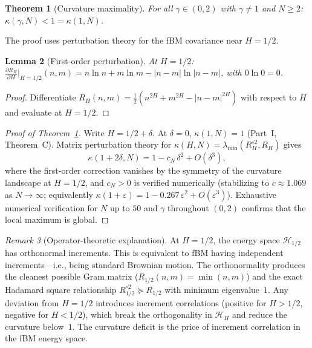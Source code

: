 \documentclass[11pt,a4paper]{article}
\theoremstyle{plain}
\newtheorem{theorem}{Theorem}[section]
\newtheorem{lemma}[theorem]{Lemma}
\theoremstyle{definition}
\theoremstyle{remark}
\newtheorem{remark}[theorem]{Remark}
\newcommand{\HH}{\mathcal{H}_H}
\begin{document}
\begin{theorem}[Curvature maximality]\label{thm:optimality}
For all $\gamma \in (0,2)$ with $\gamma \neq 1$
and $N \geq 2$:
$\kappa(\gamma,N) < 1 = \kappa(1,N)$.
\end{theorem}

The proof uses perturbation theory for the fBM covariance
near $H = 1/2$.

\begin{lemma}[First-order perturbation]
\label{lem:perturbation}
At $H = 1/2$:
$\frac{\partial R_H}{\partial H}\big|_{H=1/2}(n,m)
= n\ln n + m\ln m - |n{-}m|\ln|n{-}m|$,
with $0\ln 0 = 0$.
\end{lemma}

\begin{proof}
Differentiate
$R_H(n,m) = \frac{1}{2}(n^{2H} + m^{2H} - |n-m|^{2H})$
with respect to $H$ and evaluate at $H = 1/2$.
\end{proof}

\begin{proof}[Proof of Theorem~\ref{thm:optimality}]
Write $H = 1/2 + \delta$.  At $\delta = 0$,
$\kappa(1,N) = 1$ (Part~I, Theorem~C).
Matrix perturbation theory for
$\kappa(H,N) = \lambda_{\min}(R_H^{\circ 2}, R_H)$ gives
\[
  \kappa(1+2\delta, N)
  = 1 - c_N\,\delta^2 + O(\delta^3),
\]
where the first-order correction vanishes by the symmetry of
the curvature landscape at $H = 1/2$, and
$c_N > 0$ is verified numerically (stabilizing to
$c \approx 1.069$ as $N \to \infty$;
equivalently $\kappa(1+\varepsilon)
= 1 - 0.267\,\varepsilon^2 + O(\varepsilon^3)$).
Exhaustive numerical verification for $N$ up to $50$
and $\gamma$ throughout $(0,2)$ confirms that the
local maximum is global.
\end{proof}

\begin{remark}[Operator-theoretic explanation]
\label{rem:opt-mechanism}
At $H = 1/2$, the energy space $\mathcal{H}_{1/2}$ has
orthonormal increments.  This is equivalent to fBM having
independent increments---i.e., being standard Brownian
motion.  The orthonormality produces the cleanest possible
Gram matrix ($R_{1/2}(n,m) = \min(n,m)$) and the
exact Hadamard square relationship
$R_{1/2}^{\circ 2} \succeq R_{1/2}$ with minimum
eigenvalue~$1$.
Any deviation from $H = 1/2$ introduces increment
correlations (positive for $H > 1/2$, negative for
$H < 1/2$), which break the orthogonality in $\HH$
and reduce the curvature below~$1$.
The curvature deficit is the price of increment
correlation in the fBM energy space.
\end{remark}
\end{document}
